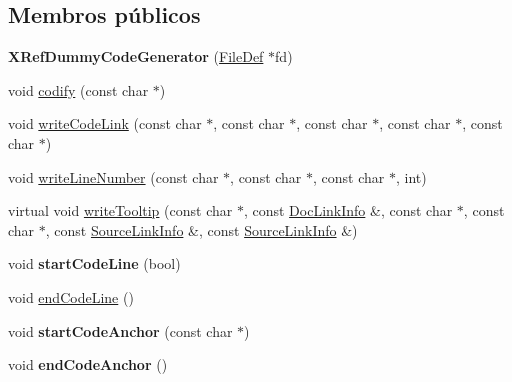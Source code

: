 \subsection*{Membros públicos}
\begin{DoxyCompactItemize}
\item 
\hypertarget{class_x_ref_dummy_code_generator_a20fdb2c44b1b6a0a08e8b0e9ecc6b097}{{\bfseries X\-Ref\-Dummy\-Code\-Generator} (\hyperlink{class_file_def}{File\-Def} $\ast$fd)}\label{class_x_ref_dummy_code_generator_a20fdb2c44b1b6a0a08e8b0e9ecc6b097}

\item 
void \hyperlink{class_x_ref_dummy_code_generator_a9e08a84e260e7b42a2dd202bfec80344}{codify} (const char $\ast$)
\item 
void \hyperlink{class_x_ref_dummy_code_generator_aee13e3ced7a85258ae400407d4383453}{write\-Code\-Link} (const char $\ast$, const char $\ast$, const char $\ast$, const char $\ast$, const char $\ast$)
\item 
void \hyperlink{class_x_ref_dummy_code_generator_a68e608aa3fa63507e7545589c3325a91}{write\-Line\-Number} (const char $\ast$, const char $\ast$, const char $\ast$, int)
\item 
virtual void \hyperlink{class_x_ref_dummy_code_generator_a1009688e232ec64f703d534ece6bd8c6}{write\-Tooltip} (const char $\ast$, const \hyperlink{struct_doc_link_info}{Doc\-Link\-Info} \&, const char $\ast$, const char $\ast$, const \hyperlink{struct_source_link_info}{Source\-Link\-Info} \&, const \hyperlink{struct_source_link_info}{Source\-Link\-Info} \&)
\item 
\hypertarget{class_x_ref_dummy_code_generator_aa76dc2000bd743981f13bb8953b51499}{void {\bfseries start\-Code\-Line} (bool)}\label{class_x_ref_dummy_code_generator_aa76dc2000bd743981f13bb8953b51499}

\item 
void \hyperlink{class_x_ref_dummy_code_generator_adbe51a89cf6f9573b3434e7cfda81a7c}{end\-Code\-Line} ()
\item 
\hypertarget{class_x_ref_dummy_code_generator_aaaa9d1622f0bac15debb1a07d443665f}{void {\bfseries start\-Code\-Anchor} (const char $\ast$)}\label{class_x_ref_dummy_code_generator_aaaa9d1622f0bac15debb1a07d443665f}

\item 
\hypertarget{class_x_ref_dummy_code_generator_a8f6cdcdd388b6121fca32dcc9e7386ab}{void {\bfseries end\-Code\-Anchor} ()}\label{class_x_ref_dummy_code_generator_a8f6cdcdd388b6121fca32dcc9e7386ab}


\end{DoxyCompactItemize}

